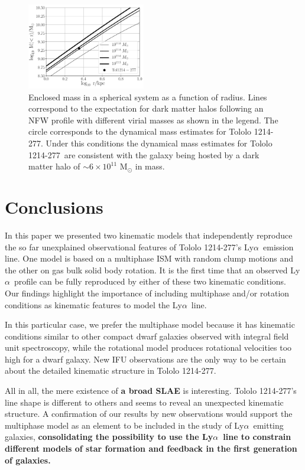 \documentclass[a4paper,fleqn,usenatbib]{mnras}
\newcommand{\tol}{Tololo 1214-277}
\newcommand{\lya}{\ifmmode{{\rm Ly}\alpha}\else Ly$\alpha$\ \fi}
\begin{document}
\begin{figure}
\begin{center}
\includegraphics[width=0.46\textwidth]{enclosed_mass.pdf}
\caption{Enclosed mass in a spherical system as a function of radius.
  Lines correspond to the expectation for dark matter halos following
  an NFW profile with
  different virial masses as shown in the legend. The circle corresponds
  to the dynamical mass estimates for \tol.  
  Under this conditions the dynamical mass estimates for \tol\ are consistent with the
  galaxy being hosted by a dark matter halo of
  $\sim 6\times10^{11}$ M$_{\odot}$ in mass.
    \label{fig:mass}} 
\end{center}
\end{figure}


\section{Conclusions}
\label{sec:conclusions}

In this paper we presented two kinematic models that independently
reproduce the so far unexplained observational features of \tol's
\lya emission line.
One model is based on a multiphase ISM with random clump motions and
the other on gas bulk solid body rotation. 
It is the first time that an observed \lya profile can be fully
reproduced by either of these two kinematic conditions.
Our findings highlight the importance of including multiphase and/or
rotation conditions as kinematic features to model the \lya line.

In this particular case, we prefer the multiphase model because it has kinematic
conditions similar to other compact dwarf galaxies observed
with integral field unit spectroscopy, while the
rotational model produces rotational velocities too high for a dwarf
galaxy.  
New IFU observations are the only way to be certain about the detailed
kinematic structure in \tol.  

All in all, the mere existence of {\bf a broad SLAE} is interesting.  
\tol's line shape is different to others and seems to reveal an
unexpected kinematic structure.
A confirmation of our results by new observations would support the multiphase model
as an element to be included in the study of \lya emitting
galaxies, {\bf consolidating the possibility to use the \lya line to
  constrain different models of star formation and feedback in the
  first generation of galaxies. }
 
\end{document}
